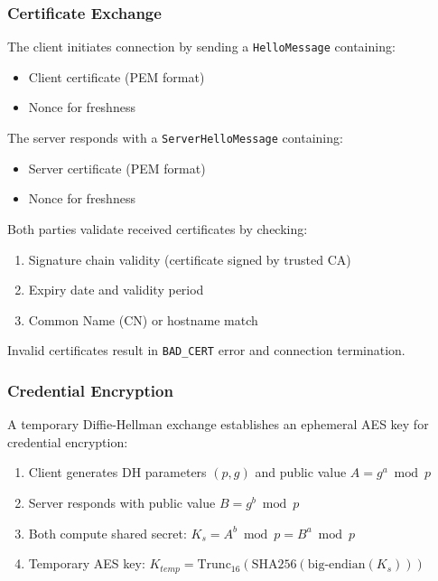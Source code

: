 \documentclass[runningheads]{llncs}
\begin{document}
\subsubsection{Certificate Exchange}

The client initiates connection by sending a \texttt{HelloMessage} containing:
\begin{itemize}
    \item Client certificate (PEM format)
    \item Nonce for freshness
\end{itemize}

The server responds with a \texttt{ServerHelloMessage} containing:
\begin{itemize}
    \item Server certificate (PEM format)
    \item Nonce for freshness
\end{itemize}

Both parties validate received certificates by checking:
\begin{enumerate}
    \item Signature chain validity (certificate signed by trusted CA)
    \item Expiry date and validity period
    \item Common Name (CN) or hostname match
\end{enumerate}

Invalid certificates result in \texttt{BAD\_CERT} error and connection termination.

\subsubsection{Credential Encryption}

A temporary Diffie-Hellman exchange establishes an ephemeral AES key for credential encryption:

\begin{enumerate}
    \item Client generates DH parameters $(p, g)$ and public value $A = g^a \bmod p$
    \item Server responds with public value $B = g^b \bmod p$
    \item Both compute shared secret: $K_s = A^b \bmod p = B^a \bmod p$
    \item Temporary AES key: $K_{temp} = \text{Trunc}_{16}(\text{SHA256}(\text{big-endian}(K_s)))$
\end{enumerate}
\end{document}

